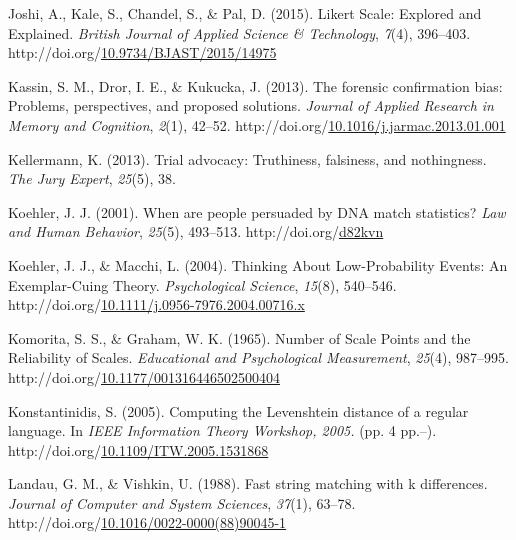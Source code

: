 \documentclass[print]{nuthesis}
\newlength{\cslhangindent}
\newenvironment{CSLReferences}[2]%
{\setlength{\parindent}{0pt}%
\everypar{\setlength{\hangindent}{\cslhangindent}}\ignorespaces}%
{\par}
\begin{document}
\begin{CSLReferences}{1}{0}
\leavevmode{}%
Joshi, A., Kale, S., Chandel, S., \& Pal, D. (2015). Likert {Scale}: {Explored} and {Explained}. \emph{British Journal of Applied Science \& Technology}, \emph{7}(4), 396--403. http://doi.org/\href{https://doi.org/10.9734/BJAST/2015/14975}{10.9734/BJAST/2015/14975}

\leavevmode{}%
Kassin, S. M., Dror, I. E., \& Kukucka, J. (2013). The forensic confirmation bias: {Problems}, perspectives, and proposed solutions. \emph{Journal of Applied Research in Memory and Cognition}, \emph{2}(1), 42--52. http://doi.org/\href{https://doi.org/10.1016/j.jarmac.2013.01.001}{10.1016/j.jarmac.2013.01.001}

\leavevmode{}%
Kellermann, K. (2013). Trial advocacy: {Truthiness}, falsiness, and nothingness. \emph{The Jury Expert}, \emph{25}(5), 38.

\leavevmode{}%
Koehler, J. J. (2001). When are people persuaded by {DNA} match statistics? \emph{Law and Human Behavior}, \emph{25}(5), 493--513. http://doi.org/\href{https://doi.org/d82kvn}{d82kvn}

\leavevmode{}%
Koehler, J. J., \& Macchi, L. (2004). Thinking {About} {Low}-{Probability} {Events}: {An} {Exemplar}-{Cuing} {Theory}. \emph{Psychological Science}, \emph{15}(8), 540--546. http://doi.org/\href{https://doi.org/10.1111/j.0956-7976.2004.00716.x}{10.1111/j.0956-7976.2004.00716.x}

\leavevmode{}%
Komorita, S. S., \& Graham, W. K. (1965). Number of {Scale} {Points} and the {Reliability} of {Scales}. \emph{Educational and Psychological Measurement}, \emph{25}(4), 987--995. http://doi.org/\href{https://doi.org/10.1177/001316446502500404}{10.1177/001316446502500404}

\leavevmode{}%
Konstantinidis, S. (2005). Computing the {Levenshtein} distance of a regular language. In \emph{{IEEE} {Information} {Theory} {Workshop}, 2005.} (pp. 4 pp.--). http://doi.org/\href{https://doi.org/10.1109/ITW.2005.1531868}{10.1109/ITW.2005.1531868}

\leavevmode{}%
Landau, G. M., \& Vishkin, U. (1988). Fast string matching with k differences. \emph{Journal of Computer and System Sciences}, \emph{37}(1), 63--78. http://doi.org/\href{https://doi.org/10.1016/0022-0000(88)90045-1}{10.1016/0022-0000(88)90045-1}


\end{CSLReferences}
\end{document}
